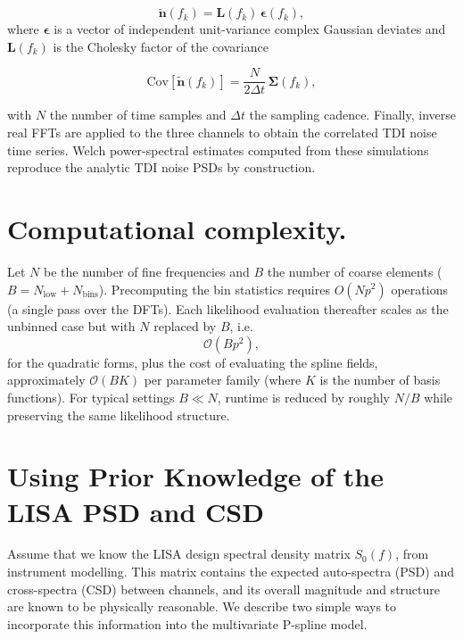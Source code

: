 \begin{equation}
\tilde{\mathbf{n}}(f_k)
=
\mathbf{L}(f_k)\,\boldsymbol{\epsilon}(f_k),
\end{equation}
%
where $\boldsymbol{\epsilon}$ is a vector of independent unit-variance
complex Gaussian deviates and
$\mathbf{L}(f_k)$ is the Cholesky factor of the covariance

\begin{equation}
\mathrm{Cov}[\tilde{\mathbf{n}}(f_k)]
=
\frac{N}{2\Delta t}\,
\boldsymbol{\Sigma}(f_k),
\end{equation}

with $N$ the number of time samples and $\Delta t$ the sampling cadence.
Finally, inverse real FFTs are applied to the three channels to obtain the
correlated TDI noise time series.
Welch power-spectral estimates computed from these simulations
reproduce the analytic TDI noise PSDs by construction.


\section{Computational complexity.}

Let $N$ be the number of fine frequencies and $B$ the number of coarse elements ($B = N_\mathrm{low} + N_\mathrm{bins}$). 
Precomputing the bin statistics requires $O(Np^2)$ operations (a single pass over the DFTs). 
Each likelihood evaluation thereafter scales as the unbinned case but with $N$ replaced by $B$, i.e.
\begin{equation}
\mathcal{O}(Bp^2),
\end{equation}
for the quadratic forms, plus the cost of evaluating the spline fields, approximately $\mathcal{O}(BK)$ per parameter family (where $K$ is the number of basis functions). 
For typical settings $B \ll N$, runtime is reduced by roughly $N/B$ while preserving the same likelihood structure.


\section{Using Prior Knowledge of the LISA PSD and CSD}

Assume that we know the LISA design spectral density matrix $S_0(f)$, from instrument modelling.  
This matrix contains the expected auto-spectra (PSD) and cross-spectra (CSD) between channels, and its overall magnitude and structure are known to be physically reasonable.  
We describe two simple ways to incorporate this information into the multivariate P-spline model.

